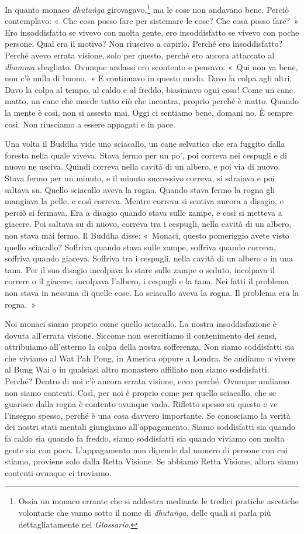 In quanto monaco \emph{dhutaṅga} girovagavo,\footnote{Ossia un monaco
  errante che si addestra mediante le tredici pratiche ascetiche
  volontarie che vanno sotto il nome di \emph{dhutaṅga}, delle quali si
  parla più dettagliatamente nel \emph{Glossario}.} ma le cose non
andavano bene. Perciò contemplavo: «~Che cosa posso fare per sistemare
le cose? Che cosa posso fare?~» Ero insoddisfatto se vivevo con molta
gente, ero insoddisfatto se vivevo con poche persone. Qual era il
motivo? Non riuscivo a capirlo. Perché ero insoddisfatto? Perché avevo
errata visione, solo per questo, perché ero ancora attaccato al
\emph{dhamma} sbagliato. Ovunque andassi ero scontento e pensavo: «~Qui
non va bene, non c'è nulla di buono.~» E continuavo in questo modo. Davo
la colpa agli altri. Davo la colpa al tempo, al caldo e al freddo,
biasimavo ogni cosa! Come un cane matto, un cane che morde tutto ciò che
incontra, proprio perché è matto. Quando la mente è così, non si assesta
mai. Oggi ci sentiamo bene, domani no. È sempre così. Non riusciamo a
essere appagati e in pace.

Una volta il Buddha vide uno sciacallo, un cane selvatico che era
fuggito dalla foresta nella quale viveva. Stava fermo per un po', poi
correva nei cespugli e di nuovo ne usciva. Quindi correva nella cavità
di un albero, e poi via di nuovo. Stava fermo per un minuto, e il minuto
successivo correva, si sdraiava e poi saltava su. Quello sciacallo aveva
la rogna. Quando stava fermo la rogna gli mangiava la pelle, e così
correva. Mentre correva si sentiva ancora a disagio, e perciò si
fermava. Era a disagio quando stava sulle zampe, e così si metteva a
giacere. Poi saltava su di nuovo, correva tra i cespugli, nella cavità
di un albero, non stava mai fermo. Il Buddha disse: «~Monaci, questo
pomeriggio avete visto quello sciacallo? Soffriva quando stava sulle
zampe, soffriva quando correva, soffriva quando giaceva. Soffriva tra i
cespugli, nella cavità di un albero o in una tana. Per il suo disagio
incolpava lo stare sulle zampe o seduto, incolpava il correre o il
giacere; incolpava l'albero, i cespugli e la tana. Nei fatti il problema
non stava in nessuna di quelle cose. Lo sciacallo aveva la rogna. Il
problema era la rogna.~»

Noi monaci siamo proprio come quello sciacallo. La nostra
insoddisfazione è dovuta all'errata visione. Siccome non esercitiamo il
contenimento dei sensi, attribuiamo all'esterno la colpa della nostra
sofferenza. Non siamo soddisfatti sia che viviamo al Wat Pah Pong, in
America oppure a Londra. Se andiamo a vivere al Bung Wai o in qualsiasi
altro monastero affiliato non siamo soddisfatti. Perché? Dentro di noi
c'è ancora errata visione, ecco perché. Ovunque andiamo non siamo
contenti. Così, per noi è proprio come per quello sciacallo, che se
guarisce dalla rogna è contento ovunque vada. Rifletto spesso su questo
e ve l'insegno spesso, perché è una cosa davvero importante. Se
conosciamo la verità dei nostri stati mentali giungiamo
all'appagamento. Siamo soddisfatti sia quando fa caldo sia quando fa
freddo, siamo soddisfatti sia quando viviamo con molta gente sia con
poca. L'appagamento non dipende dal numero di persone con cui stiamo,
proviene solo dalla Retta Visione. Se abbiamo Retta Visione, allora
siamo contenti ovunque ci troviamo.

